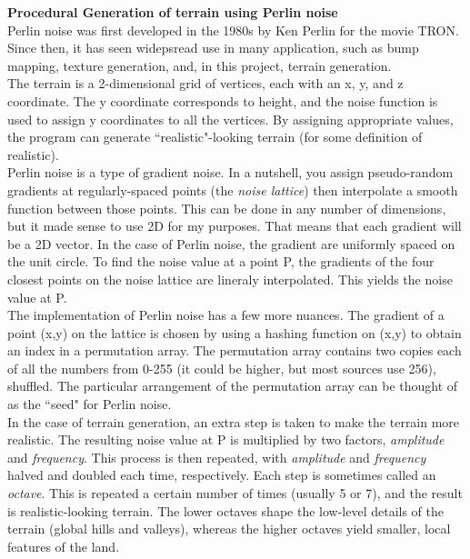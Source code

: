 \documentclass{article}
\begin{document}
	\large\noindent\textbf{Procedural Generation of terrain using Perlin noise}
	\normalsize
	\\

	Perlin noise was first developed in the 1980s by Ken Perlin for the movie TRON. Since then, it has seen widepsread use in many application, such as bump mapping, texture generation, and, in this project, terrain generation.
	\\

	The terrain is a 2-dimensional grid of vertices, each with an x, y, and z coordinate. The y coordinate corresponds to height, and the noise function is used to assign y coordinates to all the vertices. By assigning appropriate values, the program can generate ``realistic"-looking terrain (for some definition of realistic).
	\\

	Perlin noise is a type of gradient noise. In a nutshell, you assign pseudo-random gradients at regularly-spaced points (the \textit{noise lattice}) then interpolate a smooth function between those points. This can be done in any number of dimensions, but it made sense to use 2D for my purposes. That means that each gradient will be a 2D vector. In the case of Perlin noise, the gradient are uniformly spaced on the unit circle. To find the noise value at a point P, the gradients of the four closest points on the noise lattice are lineraly interpolated. This yields the noise value at P.
	\\

	The implementation of Perlin noise has a few more nuances. The gradient of a point (x,y) on the lattice is chosen by using a hashing function on (x,y) to obtain an index in a permutation array. The permutation array contains two copies each of all the numbers from 0-255 (it could be higher, but most sources use 256), shuffled. The particular arrangement of the permutation array can be thought of as the ``seed" for Perlin noise.
	\\

	In the case of terrain generation, an extra step is taken to make the terrain more realistic. The  resulting noise value at P is multiplied by two factors, \textit{amplitude} and \textit{frequency}. This process is then repeated, with \textit{amplitude} and \textit{frequency} halved and doubled each time, respectively. Each step is sometimes called an \textit{octave}. This is repeated a certain number of times (usually 5 or 7), and the result is realistic-looking terrain. The lower octaves shape the low-level details of the terrain (global hills and valleys), whereas the higher octaves yield smaller, local features of the land.
	\\
\end{document}
